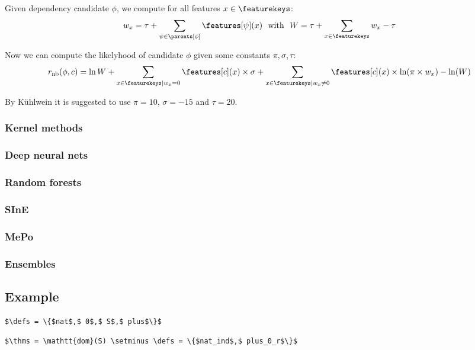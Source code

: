 \subsubsection{\nb}

Given dependency candidate $\phi$, we compute for all features $x \in \featurekeys$:
\[
	w_x = \tau + \sum_{\psi \in \parents[\phi]} \features[\psi](x) ~~\text{with}~~ W = \tau + \sum_{x \in \featurekeys} w_x - \tau
\]

Now we can compute the likelyhood of candidate $\phi$ given some constants $\pi, \sigma, \tau$:
\[
	r_\text{nb}(\phi, c) = \ln W +
	\sum_{x \in \featurekeys | w_x = 0} \features[c](x) \times \sigma +
	\sum_{x \in \featurekeys | w_x \neq 0} \features[c](x) \times \ln(\pi \times w_x) - \ln(W)
\]

By K\"uhlwein \cite{kuhlwein2013mash} it is suggested to use $\pi = 10$, $\sigma = -15$ and $\tau = 20$.

\subsubsection{Kernel methods}
\subsubsection{Deep neural nets}
\subsubsection{Random forests}
\subsubsection{SInE}
\subsubsection{MePo}
\subsubsection{Ensembles}

\subsection{Example}

\begin{lstlisting}[language=Coq, mathescape, frame=none]
$\defs = \{$nat$,$ 0$,$ S$,$ plus$\}$
\end{lstlisting}

\begin{lstlisting}[language=Coq, mathescape, frame=none]
$\thms = \mathtt{dom}(S) \setminus \defs = \{$nat_ind$,$ plus_0_r$\}$
\end{lstlisting}

